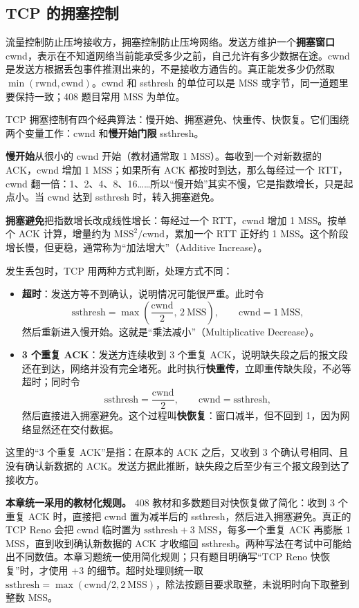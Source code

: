 \subsection{TCP 的拥塞控制}

流量控制防止压垮接收方，拥塞控制防止压垮网络。发送方维护一个\textbf{拥塞窗口} cwnd，表示在不知道网络当前能承受多少之前，自己允许有多少数据在途。cwnd 是发送方根据丢包事件推测出来的，不是接收方通告的。真正能发多少仍然取 $\min(\mathrm{rwnd},\mathrm{cwnd})$。cwnd 和 ssthresh 的单位可以是 MSS 或字节，同一道题里要保持一致；408 题目常用 MSS 为单位。

TCP 拥塞控制有四个经典算法：慢开始、拥塞避免、快重传、快恢复。它们围绕两个变量工作：cwnd 和\textbf{慢开始门限} ssthresh。

\textbf{慢开始}从很小的 cwnd 开始（教材通常取 1 MSS）。每收到一个对新数据的 ACK，cwnd 增加 1 MSS；如果所有 ACK 都按时到达，那么每经过一个 RTT，cwnd 翻一倍：1、2、4、8、16……所以“慢开始”其实不慢，它是指数增长，只是起点小。当 cwnd 达到 ssthresh 时，转入拥塞避免。

\textbf{拥塞避免}把指数增长改成线性增长：每经过一个 RTT，cwnd 增加 1 MSS。按单个 ACK 计算，增量约为 $\mathrm{MSS}^2/\mathrm{cwnd}$，累加一个 RTT 正好约 1 MSS。这个阶段增长慢，但更稳，通常称为“加法增大”（Additive Increase）。

发生丢包时，TCP 用两种方式判断，处理方式不同：

\begin{itemize}
  \item \textbf{超时}：发送方等不到确认，说明情况可能很严重。此时令
  \[
  \mathrm{ssthresh}=\max\left(\frac{\mathrm{cwnd}}{2},\,2\ \mathrm{MSS}\right),\qquad
  \mathrm{cwnd}=1\ \mathrm{MSS},
  \]
  然后重新进入慢开始。这就是“乘法减小”（Multiplicative Decrease）。
  \item \textbf{3 个重复 ACK}：发送方连续收到 3 个重复 ACK，说明缺失段之后的报文段还在到达，网络并没有完全堵死。此时执行\textbf{快重传}，立即重传缺失段，不必等超时；同时令
  \[
  \mathrm{ssthresh}=\frac{\mathrm{cwnd}}{2},\qquad
  \mathrm{cwnd}=\mathrm{ssthresh},
  \]
  然后直接进入拥塞避免。这个过程叫\textbf{快恢复}：窗口减半，但不回到 1，因为网络显然还在交付数据。
\end{itemize}

这里的“3 个重复 ACK”是指：在原本的 ACK 之后，又收到 3 个确认号相同、且没有确认新数据的 ACK。发送方据此推断，缺失段之后至少有三个报文段到达了接收方。

\begin{attention}
\textbf{本章统一采用的教材化规则。} 408 教材和多数题目对快恢复做了简化：收到 3 个重复 ACK 时，直接把 cwnd 置为减半后的 ssthresh，然后进入拥塞避免。真正的 TCP Reno 会把 cwnd 临时置为 $\mathrm{ssthresh}+3$ MSS，每多一个重复 ACK 再膨胀 1 MSS，直到收到确认新数据的 ACK 才收缩回 ssthresh。两种写法在考试中可能给出不同数值。本章习题统一使用简化规则；只有题目明确写“TCP Reno 快恢复”时，才使用 $+3$ 的细节。超时处理则统一取 $\mathrm{ssthresh}=\max(\mathrm{cwnd}/2,2\ \mathrm{MSS})$，除法按题目要求取整，未说明时向下取整到整数 MSS。
\end{attention}

